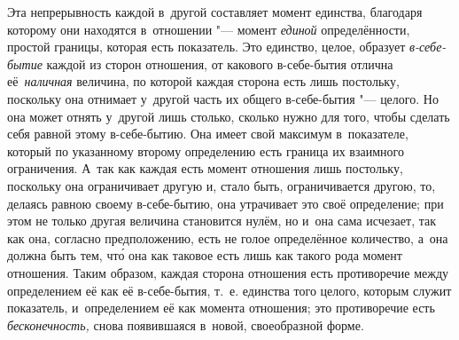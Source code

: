 Эта непрерывность каждой в~другой составляет момент единства, благодаря
которому они находятся в~отношении "--- момент {\em единой} определённости,
простой границы, которая есть показатель. Это единство, целое, образует
{\em в-себе-бытие} каждой из сторон отношения, от какового в-себе-бытия отлична
её~{\em наличная} величина, по которой каждая сторона есть лишь постольку,
поскольку она отнимает у~другой часть их общего в-себе-бытия "--- целого. Но
она может отнять у~другой лишь столько, сколько нужно для того, чтобы сделать
себя равной этому в-себе-бытию. Она имеет свой максимум в~показателе, который
по указанному второму определению есть граница их взаимного ограничения. А~так
как каждая есть момент отношения лишь постольку, поскольку она ограничивает
другую и, стало быть, ограничивается другою, то, делаясь равною своему
в-себе-бытию, она утрачивает это своё определение; при этом не только другая
величина становится нулём, но и~она сама
исчезает, так как она, согласно предположению, есть не голое определённое
количество, а~она должна быть тем, чт\'{о} она как таковое есть лишь как
такого рода момент отношения. Таким образом, каждая сторона отношения есть
противоречие между определением её как её в-себе-бытия, т.~е. единства того
целого, которым служит показатель, и~определением её как момента отношения; это
противоречие есть {\em бесконечность,} снова появившаяся в~новой, своеобразной
форме.

